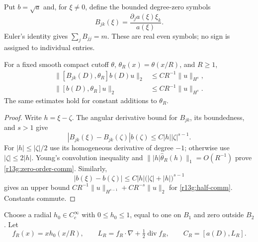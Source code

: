 Put $b=\sqrt a$ and, for $\xi\ne0$, define the bounded degree-zero
symbols
\[
 B_{jk}(\xi)=\frac{\partial_j a(\xi)\xi_k}{a(\xi)}.
\]
Euler's identity gives $\sum_jB_{jj}=m$. These are real even symbols;
no sign is assigned to individual entries.

\begin{lemma}
\label{lem:r13g-cutoff}
For a fixed smooth compact cutoff $\theta$, $\theta_R(x)=\theta(x/R)$,
and $R\ge1$,
\begin{align}
 \|[B_{jk}(D),\theta_R]b(D)u\|_2
 &\le CR^{-1}\|u\|_{H^s},\label{r13g:zero-order-comm}\\
 \|[b(D),\theta_R]u\|_2
 &\le CR^{-1}\|u\|_{H^s}.\label{r13g:half-comm}
\end{align}
The same estimates hold for constant additions to $\theta_R$.
\end{lemma}
\begin{proof}
Write $h=\xi-\zeta$. The angular derivative bound for $B_{jk}$,
its boundedness, and $s>1$ give
\[
 |B_{jk}(\xi)-B_{jk}(\zeta)|b(\zeta)
 \le C|h||\zeta|^{s-1}.
\]
For $|h|\le|\zeta|/2$ use its homogeneous derivative of degree $-1$;
otherwise use $|\zeta|\le2|h|$. Young's convolution inequality and
$\||h|\widehat\theta_R(h)\|_1=O(R^{-1})$ prove
\eqref{r13g:zero-order-comm}. Similarly,
\[
 |b(\xi)-b(\zeta)|
 \le C|h|\bigl(|\zeta|+|h|\bigr)^{s-1}
\]
gives an upper bound
$CR^{-1}\|u\|_{H^{s-1}}+CR^{-s}\|u\|_2$ for
\eqref{r13g:half-comm}. Constants commute.
\end{proof}

Choose a radial $h_0\in C_c^\infty$ with $0\le h_0\le1$, equal
to one on $B_1$ and zero outside $B_2$. Let
\[
 f_R(x)=x h_0(x/R),\qquad
 L_R=f_R\cdot\nabla+\tfrac12\operatorname{div}f_R,
 \qquad C_R=[a(D),L_R].
\]

